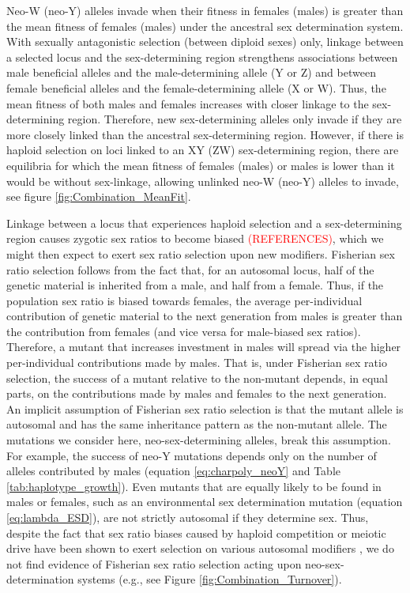 \documentclass[12pt]{article}
\begin{document}
Neo-W (neo-Y) alleles invade when their fitness in females (males) is greater than the mean fitness of females (males) under the ancestral sex determination system.
With sexually antagonistic selection (between diploid sexes) only, linkage between a selected locus and the sex-determining region strengthens associations between male beneficial alleles and the male-determining allele (Y or Z) and between female beneficial alleles and the female-determining allele (X or W). 
Thus, the mean fitness of both males and females increases with closer linkage to the sex-determining region. 
Therefore, new sex-determining alleles only invade if they are more closely linked than the ancestral sex-determining region. 
However, if there is haploid selection on loci linked to an XY (ZW) sex-determining region, there are equilibria for which the mean fitness of females (males) or males is lower than it would be without sex-linkage, allowing unlinked neo-W (neo-Y) alleles to invade, see figure \ref{fig:Combination_MeanFit}. 

Linkage between a locus that experiences haploid selection and a sex-determining region causes zygotic sex ratios to become biased \textcolor{red}{(REFERENCES)}, which we might then expect to exert sex ratio selection upon new modifiers.
Fisherian sex ratio selection follows from the fact that, for an autosomal locus, half of the genetic material is inherited from a male, and half from a female. 
Thus, if the population sex ratio is biased towards females, the average per-individual contribution of genetic material to the next generation from males is greater than the contribution from females (and vice versa for male-biased sex ratios). 
Therefore, a mutant that increases investment in males will spread via the higher per-individual contributions made by males. 
That is, under Fisherian sex ratio selection, the success of a mutant relative to the non-mutant depends, in equal parts, on the contributions made by males and females to the next generation. 
An implicit assumption of Fisherian sex ratio selection is that the mutant allele is autosomal and has the same inheritance pattern as the non-mutant allele. 
The mutations we consider here, neo-sex-determining alleles, break this assumption. 
For example, the success of neo-Y mutations depends only on the number of alleles contributed by males (equation \ref{eq:charpoly_neoY} and Table \ref{tab:haplotype_growth}). 
Even mutants that are equally likely to be found in males or females, such as an environmental sex determination mutation (equation \ref{eq:lambda_ESD}), are not strictly autosomal if they determine sex. 
Thus, despite the fact that sex ratio biases caused by haploid competition or meiotic drive have been shown to exert selection on various autosomal modifiers \citep{Stalker:1961th,Smith:1975ft,Frank:1989vl,Hough:2013uo,Ubeda:2015fx, Otto:2015va}, we do not find evidence of Fisherian sex ratio selection acting upon neo-sex-determination systems (e.g., see Figure \ref{fig:Combination_Turnover}). 
\end{document}

